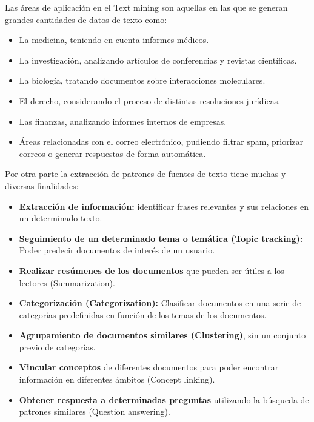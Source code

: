 \documentclass[12pt, twoside, openright]{report} %
\begin{document}
Las áreas de aplicación en el Text mining son aquellas en las que se generan grandes cantidades de datos de texto como:
\begin{itemize}
	\item La medicina, teniendo en cuenta informes médicos.
	\item La investigación, analizando artículos de conferencias y revistas científicas.
	\item La biología, tratando documentos sobre interacciones moleculares.
	\item El derecho, considerando el proceso de distintas resoluciones jurídicas.
	\item Las finanzas, analizando informes internos de empresas.
	\item Áreas relacionadas con el correo electrónico, pudiendo filtrar spam, priorizar correos o generar respuestas de forma automática.
\end{itemize} 
Por otra parte la extracción de patrones de fuentes de texto tiene muchas y diversas finalidades:
\begin{itemize}
	\item \textbf{Extracción de información:} identificar frases relevantes y sus relaciones en un determinado texto.
	\item \textbf{Seguimiento de un determinado tema o temática (Topic tracking):} Poder predecir documentos de interés de un usuario.
	\item \textbf{Realizar resúmenes de los documentos} que pueden ser útiles a los lectores (Summarization).
	\item \textbf{Categorización (Categorization):} Clasificar documentos en una serie de categorías predefinidas en función de los temas de los documentos.
	\item \textbf{Agrupamiento de documentos similares (Clustering)}, sin un conjunto previo de categorías.
	\item \textbf{Vincular conceptos} de diferentes documentos para poder encontrar información en diferentes ámbitos (Concept linking).
	\item \textbf{Obtener respuesta a determinadas preguntas} utilizando la búsqueda de patrones similares (Question answering).
\end{itemize}
\end{document}
